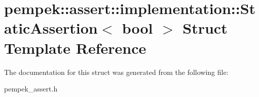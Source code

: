 \hypertarget{structpempek_1_1assert_1_1implementation_1_1_static_assertion}{}\section{pempek\+:\+:assert\+:\+:implementation\+:\+:Static\+Assertion$<$ bool $>$ Struct Template Reference}
\label{structpempek_1_1assert_1_1implementation_1_1_static_assertion}


The documentation for this struct was generated from the following file\+:\begin{DoxyCompactItemize}
\item 
pempek\+\_\+assert.\+h\end{DoxyCompactItemize}
